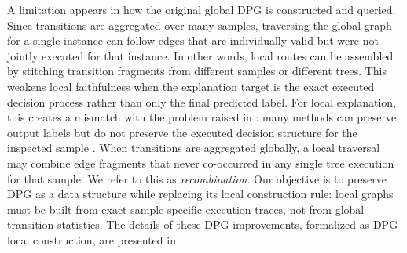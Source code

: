 \documentclass[runningheads]{llncs}
\begin{document}
A limitation appears in how the original global DPG is constructed and queried. Since transitions are aggregated over many samples, traversing the global graph for a single instance can follow edges that are individually valid but were not jointly executed for that instance. 
In other words, local routes can be assembled by stitching transition fragments from different samples or different trees. 
This weakens local faithfulness when the explanation target is the exact executed decision process rather than only the final predicted label.
For local explanation, this creates a mismatch with the problem raised in : many methods can preserve output labels but do not preserve the executed decision structure for the inspected sample \cite{nauta2023anecdotal,krishna2022disagreement}. When transitions are aggregated globally, a local traversal may combine edge fragments that never co-occurred in any single tree execution for that sample. We refer to this as \emph{recombination}.
Our objective is to preserve DPG as a data structure while replacing its local construction rule: local graphs must be built from exact sample-specific execution traces, not from global transition statistics. The details of these DPG improvements, formalized as DPG-local construction, are presented in .
\end{document}
